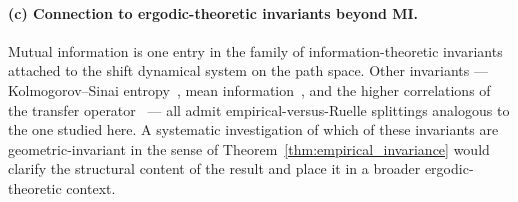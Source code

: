 \paragraph{(c) Connection to ergodic-theoretic invariants beyond MI.}
Mutual information is one entry in the family of information-theoretic
invariants attached to the shift dynamical system on the path
space. Other invariants ---
Kolmogorov--Sinai entropy~\cite{Walters1982},
mean information~\cite{KrengelBook}, and the higher
correlations of the transfer operator~\cite{Seneta2006} --- all
admit empirical-versus-Ruelle splittings analogous to the one
studied here. A systematic investigation of which of these
invariants are geometric-invariant in the sense of
Theorem~\ref{thm:empirical_invariance} would clarify the structural
content of the result and place it in a broader ergodic-theoretic
context.
